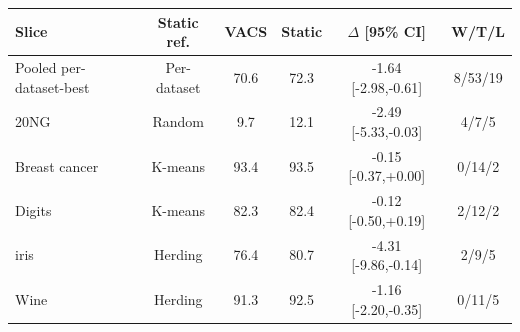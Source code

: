 \begin{tabular}{lccccc}
\toprule
Slice & Static ref. & VACS & Static & $\Delta$ [95\% CI] & W/T/L \\
\midrule
Pooled per-dataset-best & Per-dataset & 70.6 & 72.3 & -1.64 [-2.98,-0.61] & 8/53/19 \\
20NG & Random & 9.7 & 12.1 & -2.49 [-5.33,-0.03] & 4/7/5 \\
Breast cancer & K-means & 93.4 & 93.5 & -0.15 [-0.37,+0.00] & 0/14/2 \\
Digits & K-means & 82.3 & 82.4 & -0.12 [-0.50,+0.19] & 2/12/2 \\
iris & Herding & 76.4 & 80.7 & -4.31 [-9.86,-0.14] & 2/9/5 \\
Wine & Herding & 91.3 & 92.5 & -1.16 [-2.20,-0.35] & 0/11/5 \\
\bottomrule
\end{tabular}
